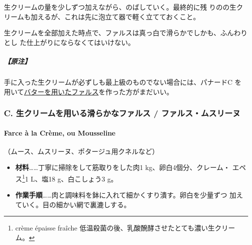 \begin{recette}
生クリームの\untiers{}量を少しずつ加えながら、のばしていく。最終的に残
りの\deuxtiers{}の生クリームも加えるが、これは先に泡立て器で軽く立てておくこと。

生クリームを全部加えた時点で、ファルスは真っ白で滑らかでしかも、ふんわりとし
た仕上がりにならなくてはいけない。

\hypertarget{ux539fux6ce8-1}{%
\subparagraph{【原注】}\label{ux539fux6ce8-1}}

手に入った生クリームが必ずしも最上級のものでない場合には、パナードC を
用いて\protect\hyperlink{farce-a}{バターを用いたファルス}を作った方がまだいい。

\maeaki

\hypertarget{c.-ux751fux30afux30eaux30fcux30e0ux3092ux7528ux3044ux308bux6ed1ux3089ux304bux306aux30d5ux30a1ux30ebux30b9-ux30d5ux30a1ux30ebux30b9ux30e0ux30b9ux30eaux30fcux30cc}{%
\subsubsection{C. 生クリームを用いる滑らかなファルス /
ファルス・ムスリーヌ}\label{c.-ux751fux30afux30eaux30fcux30e0ux3092ux7528ux3044ux308bux6ed1ux3089ux304bux306aux30d5ux30a1ux30ebux30b9-ux30d5ux30a1ux30ebux30b9ux30e0ux30b9ux30eaux30fcux30cc}}

\hypertarget{farce-c}{%
\paragraph{Farce à la Crème, ou Mousseline}\label{farce-c}}


（ムース、ムスリーヌ、ポタージュ用クネルなど）

\begin{itemize}
\item
  \textbf{材料}\ldots{}\ldots{}丁寧に掃除をして筋取りをした肉1
  kg、卵白4個分、クレーム・ エペス\footnote{crème épaisse fraîche
    低温殺菌の後、乳酸醗酵させたとても濃い生クリーム。}1\undemi{}
  L、塩18 g、白こしょう3 g。
\item
  \textbf{作業手順}\ldots{}\ldots{}肉と調味料を鉢に入れて細かくすり潰す。卵白を少量ずつ
  加えていく。目の細かい網で裏漉しする。
\end{itemize}


\end{recette}
